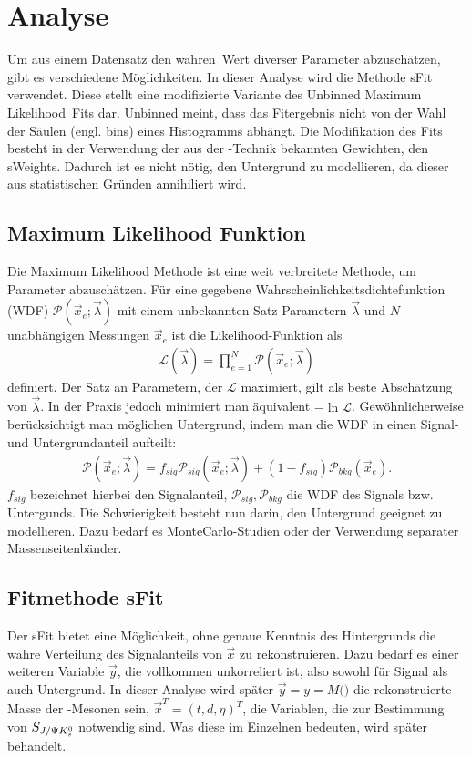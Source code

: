 \chapter{Analyse} \label{kap:analyse}
Um aus einem Datensatz den \glqq wahren\grqq\ Wert diverser Parameter abzuschätzen, gibt es verschiedene Möglichkeiten. In dieser Analyse wird die Methode sFit verwendet. Diese stellt eine modifizierte Variante des \glqq Unbinned Maximum Likelihood\grqq\ Fits dar. Unbinned meint, dass das Fitergebnis nicht von der Wahl der Säulen (engl. bins) eines Histogramms abhängt. Die Modifikation des Fits besteht in der Verwendung der aus der \SPlot-Technik bekannten Gewichten, den sWeights. Dadurch ist es nicht nötig, den Untergrund zu modellieren, da dieser aus statistischen Gründen annihiliert wird.

\section{Maximum Likelihood Funktion}
Die Maximum Likelihood Methode ist eine weit verbreitete Methode, um Parameter abzuschätzen. Für eine gegebene Wahrscheinlichkeitsdichtefunktion (WDF) $\mathcal{P}(\vec{x}_e;\vec{\lambda})$ mit einem unbekannten Satz Parametern $\vec{\lambda}$ und $N$ unabhängigen Messungen $\vec{x}_e$ ist die Likelihood-Funktion als
\begin{align}
\mathcal{L}(\vec{\lambda}) = \prod_{e=1}^N \mathcal{P}(\vec{x}_e;\vec{\lambda})
\end{align}
definiert. Der Satz an Parametern, der $\mathcal{L}$ maximiert, gilt als beste Abschätzung von $\vec{\lambda}$. In der Praxis jedoch minimiert man äquivalent $-\ln\mathcal{L}$. Gewöhnlicherweise berücksichtigt man möglichen Untergrund, indem man die WDF in einen Signal- und Untergrundanteil aufteilt:
\begin{align}
\mathcal{P}(\vec{x}_e;\vec{\lambda}) = f_{sig}\mathcal{P}_{sig}(\vec{x}_e;\vec{\lambda}) + (1-f_{sig})\mathcal{P}_{bkg}(\vec{x}_e). \label{eq:likelihood_sig_bkg}
\end{align}
$f_{sig}$ bezeichnet hierbei den Signalanteil, $\mathcal{P}_{sig}, \mathcal{P}_{bkg}$ die WDF des Signals bzw. Untergunds. Die Schwierigkeit besteht nun darin, den Untergrund geeignet zu modellieren. Dazu bedarf es MonteCarlo-Studien oder der Verwendung separater Massenseitenbänder. \cite{sfit}

\section{Fitmethode sFit} \label{kap:sfit}
Der sFit bietet eine Möglichkeit, ohne genaue Kenntnis des Hintergrunds die wahre Verteilung des Signalanteils von $\vec{x}$ zu rekonstruieren. Dazu bedarf es einer weiteren Variable $\vec{y}$, die vollkommen unkorreliert ist, also sowohl für Signal als auch Untergrund. In dieser Analyse wird später $\vec{y} = y = M($\Bd$)$ die rekonstruierte Masse der \Bd-Mesonen sein, $\vec{x}^T = (t,d,\eta)^T$, die Variablen, die zur Bestimmung von $S_{J/\Psi K_s^0}$ notwendig sind. Was diese im Einzelnen bedeuten, wird später behandelt.

